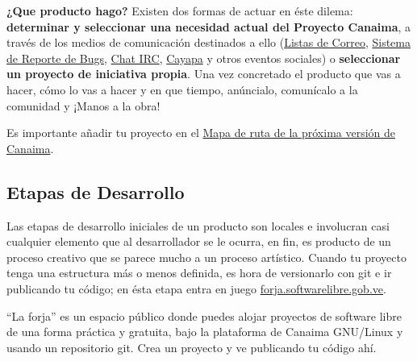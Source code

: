\documentclass[letterpaper,12pt,spanish]{manual}
\begin{document}
\textbf{¿Que producto hago?} Existen dos formas de actuar en éste dilema: \textbf{determinar y seleccionar una necesidad actual del Proyecto Canaima}, a través de los medios de comunicación destinados a ello (\href{http://listas.canaima.softwarelibre.gob.ve/cgi-bin/mailman/listinfo}{Listas de Correo}, \href{http://proyectos.canaima.softwarelibre.gob.ve/canaima/query}{Sistema de Reporte de Bugs}, \href{http://canaima.softwarelibre.gob.ve/soporte/soporte/chat-irc}{Chat IRC}, \href{http://cayapa.canaima.softwarelibre.gob.ve/}{Cayapa} y otros eventos sociales) o \textbf{seleccionar un proyecto de iniciativa propia}. Una vez concretado el producto que vas a hacer, cómo lo vas a hacer y en que tiempo, anúncialo, comunícalo a la comunidad y ¡Manos a la obra!

Es importante añadir tu proyecto en el \href{http://canaima.softwarelibre.gob.ve/descargas/canaima-dvdnvivo/mapa-de-ruta}{Mapa de ruta de la próxima versión de Canaima}.


\subsection{Etapas de Desarrollo}

Las etapas de desarrollo iniciales de un producto son locales e involucran casi cualquier elemento que al desarrollador se le ocurra, en fin, es producto de un proceso creativo que se parece mucho a un proceso artístico. Cuando tu proyecto tenga una estructura más o menos definida, es hora de versionarlo con git e ir publicando tu código; en ésta etapa entra en juego \href{http://forja.softwarelibre.gob.ve/}{forja.softwarelibre.gob.ve}.

“La forja” es un espacio público donde puedes alojar proyectos de software libre de una forma práctica y gratuita, bajo la plataforma de Canaima GNU/Linux y usando un repositorio git. Crea un proyecto y ve publicando tu código ahí.
\end{document}
